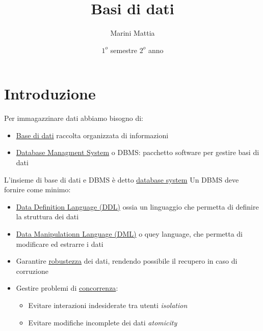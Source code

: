 \endofdump

\usetikzlibrary {er}
\usetikzlibrary{external}
\usetikzlibrary{patterns}
\tikzexternalize[prefix=tikz/]

\title{Basi di dati}
\author{Marini Mattia}
\date{$ 1^o $ semestre $ 2^o $ anno}


\maketitle
\tableofcontents

\section{Introduzione}
Per immagazzinare dati abbiamo bisogno di:
\begin{itemize}
	\item \underline{Base di dati} raccolta organizzata  di informazioni
	\item \underline{Database Managment System} o DBMS: pacchetto software per gestire basi di dati
\end{itemize}
L'insieme di base di dati e DBMS è detto \underline{database system}
\vskip3mm
Un DBMS deve fornire come minimo:
\begin{itemize}
	\item \underline{Data Definition Language (DDL)} ossia un linguaggio che permetta di definire la struttura dei dati
	\item \underline{Data Manipulationn Language (DML)} o quey language, che permetta di modificare ed estrarre i dati
	\item Garantire \underline{robustezza} dei dati, rendendo possibile il recupero in caso di corruzione
	\item Gestire problemi di \underline{concorrenza}:
	      \begin{itemize}
		      \item Evitare interazioni indesiderate tra utenti \textit{isolation}
		      \item Evitare modifiche incomplete dei dati \textit{atomicity}
	      \end{itemize}
\end{itemize}

